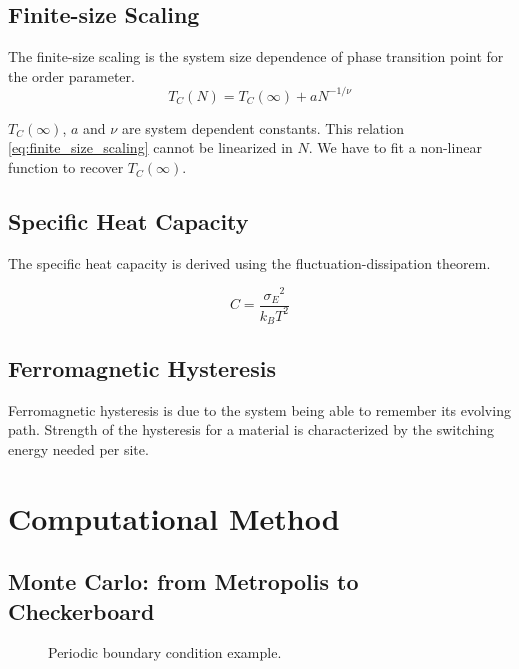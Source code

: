 \documentclass[%
showkeys,
bibnotes,
amsmath,amssymb,
floatfix,
]{revtex4-1}
\begin{document}
\subsection{\label{sec:theory:finite_size_scaline}Finite-size Scaling}

The finite-size scaling is the system size dependence of phase transition point for the order parameter.
\begin{equation}
T_{C}(N) = T_{C}(\infty) + aN^{-1/\nu} \label{eq:finite_size_scaling}
\end{equation}

$T_C(\infty)$, $a$ and $\nu$ are system dependent constants. This relation \ref{eq:finite_size_scaling} cannot be linearized in $N$. We have to fit a non-linear function to recover $T_C(\infty)$.

\subsection{\label{sec:theory:specific_heat}Specific Heat Capacity}
The specific heat capacity is derived using the fluctuation-dissipation theorem.

\begin{equation}
C = \frac{{\sigma_E}^2}{k_B T^2} \label{eq:spec_heat}
\end{equation}


\subsection{\label{sec:theory:2dising}Ferromagnetic Hysteresis}


Ferromagnetic hysteresis is due to the system being able to remember its evolving path. Strength of the hysteresis for a material is characterized by the switching energy needed per site.


\section{\label{sec:method}Computational Method}

\subsection{\label{sec:mc}Monte Carlo: from Metropolis to Checkerboard}

\begin{figure}[H] \centering
	\caption{\label{fig:periodicc_bc} Periodic boundary condition example.}
\end{figure}
\end{document}
